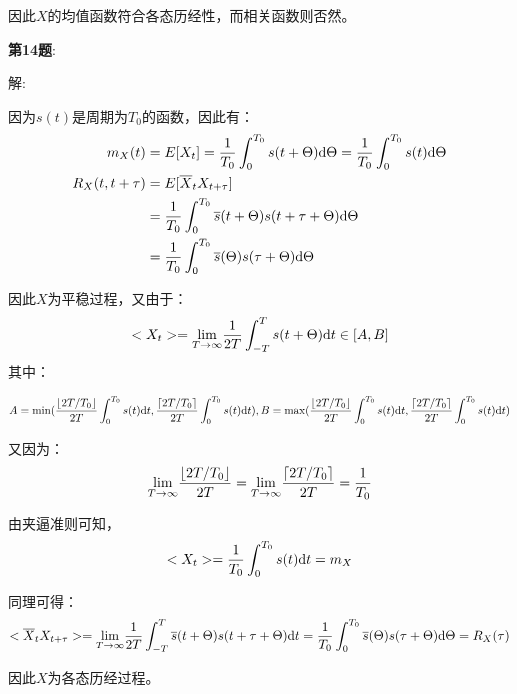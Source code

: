 \documentclass{article}
\begin{document}
因此$X$的均值函数符合各态历经性，而相关函数则否然。

\noindent
\textbf{第14题}:

\noindent
解:

因为$s(t)$是周期为$T_{0}$的函数，因此有：
\begin{equation}
    \begin{aligned}
        m_{X}(t)&=E[X_{t}]=\frac{1}{T_{0}}\int_{0}^{T_{0}}s(t+\Theta){\rm d}\Theta=\frac{1}{T_{0}}\int_{0}^{T_{0}}s(t){\rm d}\Theta\\
        R_{X}(t,t+\tau)&=E[\overline{X}_{t}{X}_{t+\tau}]\\
        &=\frac{1}{T_{0}}\int_{0}^{T_{0}}\overline{s}(t+\Theta){s}(t+\tau+\Theta){\rm d}\Theta\\
        &=\frac{1}{T_{0}}\int_{0}^{T_{0}}\overline{s}(\Theta){s}(\tau+\Theta){\rm d}\Theta
    \end{aligned}
\end{equation}

因此$X$为平稳过程，又由于：
\begin{equation}
    <X_{t}>=\underset{T\rightarrow\infty}{{\rm lim}}\frac{1}{2T}\int_{-T}^{T}s(t+\Theta){\rm d}t\in[A,B]
\end{equation}
其中：

\begin{equation}
    A=\min(\frac{\lfloor 2T/T_{0}\rfloor}{2T}\int_{0}^{T_0}s(t){\rm d}t,\frac{\lceil 2T/T_{0}\rceil}{2T}\int_{0}^{T_0}s(t){\rm d}t),
    B=\max(\frac{\lfloor 2T/T_{0}\rfloor}{2T}\int_{0}^{T_0}s(t){\rm d}t,\frac{\lceil 2T/T_{0}\rceil}{2T}\int_{0}^{T_0}s(t){\rm d}t)
\end{equation}

又因为：
\begin{equation}
    \underset{T\rightarrow\infty}{{\rm lim}}\frac{\lfloor 2T/T_{0}\rfloor}{2T}=
    \underset{T\rightarrow\infty}{{\rm lim}}\frac{\lceil 2T/T_{0}\rceil}{2T}=
    \frac{1}{T_{0}}
\end{equation}

由夹逼准则可知，
\begin{equation}
    <X_{t}>=\frac{1}{T_{0}}\int_{0}^{T_{0}}s(t){\rm d}t=m_{X}
\end{equation}

同理可得：
\begin{equation}
    <\overline{X}_{t}X_{t+\tau}>=\underset{T\rightarrow\infty}{{\rm lim}}\frac{1}{2T}\int_{-T}^{T}\overline{s}(t+\Theta){s}(t+\tau+\Theta){\rm d}t=
    \frac{1}{T_{0}}\int_{0}^{T_{0}}\overline{s}(\Theta){s}(\tau+\Theta){\rm d}\Theta=R_{X}(\tau)
\end{equation}

因此$X$为各态历经过程。
 
\end{document}

